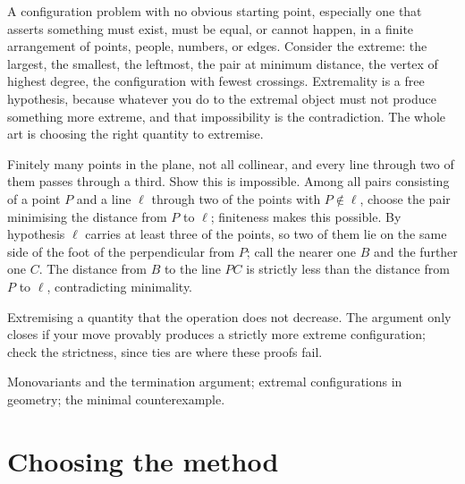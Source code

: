 \cue A configuration problem with no obvious starting point, especially one that asserts something must exist, must be equal, or cannot happen, in a finite arrangement of points, people, numbers, or edges.
\method Consider the extreme: the largest, the smallest, the leftmost, the pair at minimum distance, the vertex of highest degree, the configuration with fewest crossings. Extremality is a free hypothesis, because whatever you do to the extremal object must not produce something more extreme, and that impossibility is the contradiction. The whole art is choosing the right quantity to extremise.

\begin{worked}
Finitely many points in the plane, not all collinear, and every line through two of them passes through a third. Show this is impossible. Among all pairs consisting of a point $P$ and a line $\ell$ through two of the points with $P\notin\ell$, choose the pair minimising the distance from $P$ to $\ell$; finiteness makes this possible. By hypothesis $\ell$ carries at least three of the points, so two of them lie on the same side of the foot of the perpendicular from $P$; call the nearer one $B$ and the further one $C$. The distance from $B$ to the line $PC$ is strictly less than the distance from $P$ to $\ell$, contradicting minimality.
\end{worked}

\begin{trap}
Extremising a quantity that the operation does not decrease. The argument only closes if your move provably produces a strictly more extreme configuration; check the strictness, since ties are where these proofs fail.
\end{trap}

\begin{seealsob}Monovariants and the termination argument; extremal configurations in geometry; the minimal counterexample.\end{seealsob}

\section{Choosing the method}

